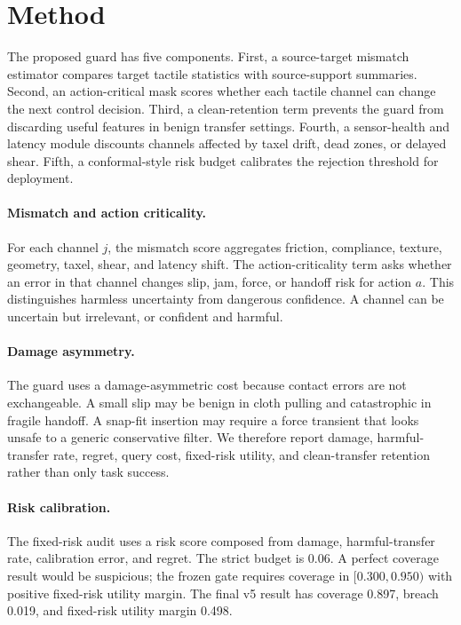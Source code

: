 \documentclass{article}
\begin{document}
\section{Method}
The proposed guard has five components. First, a source-target mismatch estimator compares target tactile statistics with source-support summaries. Second, an action-critical mask scores whether each tactile channel can change the next control decision. Third, a clean-retention term prevents the guard from discarding useful features in benign transfer settings. Fourth, a sensor-health and latency module discounts channels affected by taxel drift, dead zones, or delayed shear. Fifth, a conformal-style risk budget calibrates the rejection threshold for deployment.

\paragraph{Mismatch and action criticality.}
For each channel $j$, the mismatch score aggregates friction, compliance, texture, geometry, taxel, shear, and latency shift. The action-criticality term asks whether an error in that channel changes slip, jam, force, or handoff risk for action $a$. This distinguishes harmless uncertainty from dangerous confidence. A channel can be uncertain but irrelevant, or confident and harmful.

\paragraph{Damage asymmetry.}
The guard uses a damage-asymmetric cost because contact errors are not exchangeable. A small slip may be benign in cloth pulling and catastrophic in fragile handoff. A snap-fit insertion may require a force transient that looks unsafe to a generic conservative filter. We therefore report damage, harmful-transfer rate, regret, query cost, fixed-risk utility, and clean-transfer retention rather than only task success.

\paragraph{Risk calibration.}
The fixed-risk audit uses a risk score composed from damage, harmful-transfer rate, calibration error, and regret. The strict budget is 0.06. A perfect coverage result would be suspicious; the frozen gate requires coverage in $[0.300,0.950)$ with positive fixed-risk utility margin. The final v5 result has coverage 0.897, breach 0.019, and fixed-risk utility margin 0.498.
\end{document}
